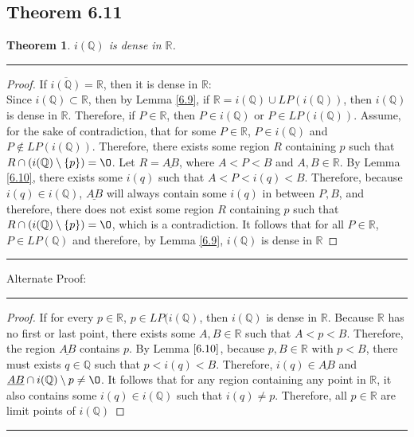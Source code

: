 \documentclass[openany, amssymb, psamsfonts]{amsart}
\newcommand{\bbQ}{\mathbb{Q}}
\newcommand{\bbR}{\mathbb{R}}
\renewcommand{\emptyset}{\O}
\newcommand{\sm}{\setminus}
\newtheorem{thm}{Theorem}[section]
\theoremstyle{definition}
\numberwithin{equation}{section}
\begin{document}
\subsection*{Theorem 6.11}
\begin{thm}
\label{6.11}
$i(\bbQ)$ is dense in $\bbR$.
\end{thm}
\vspace{4pt}     \hrule   \vspace{4pt} \begin{proof} If $\overline{i(\bbQ)} = \bbR$, then it is dense in $\bbR$:\\
Since $i(\bbQ) \subset \bbR$, then by Lemma \ref{6.9}, if $\bbR = i(\bbQ) \cup LP(i(\bbQ))$, then $i(\bbQ)$ is dense in $\bbR$. Therefore, if $P\in \bbR$, then $P\in i(\bbQ)$ or $P\in LP(i(\bbQ))$. Assume, for the sake of contradiction, that for some $P\in \bbR$, $P\in i(\bbQ)$ and $P\notin LP(i(\bbQ))$. Therefore, there exists some region $R$ containing $p$ such that $R\cap (i(\bbQ)\sm\{p\}) = \emptyset$. Let $R= \underline{AB}$, where $A<P<B$ and $A,B\in \bbR$. By Lemma \ref{6.10}, there exists some $i(q)$ such that $A<P<i(q)<B$. Therefore, because $i(q)\in i(\bbQ)$, $\underline{AB}$ will always contain some $i(q)$ in between $P,B$, and therefore, there does not exist some region $R$ containing $p$ such that $R\cap (i(\bbQ)\sm\{p\}) = \emptyset$, which is a contradiction. It follows that for all $P\in \bbR$, $P\in LP(\bbQ)$ and therefore, by Lemma \ref{6.9}, $i(\bbQ)$ is dense in $\bbR$
\end{proof}
\vspace{4pt}     \hrule   \vspace{4pt}
Alternate Proof:
\vspace{4pt}     \hrule   \vspace{4pt} \begin{proof} 
If for every $p\in \bbR$, $p\in LP(i(\bbQ)$, then $i(\bbQ)$ is dense in $\bbR$. Because $\bbR$ has no first or last point, there exists some $A,B \in \bbR$ such that $A<p<B$. Therefore, the region $\underline{AB}$ contains $p$. By Lemma $\ref{6.10}$, because $p,B \in \bbR$ with $p<B$, there must exists $q\in \bbQ$ such that $p<i(q)<B$. Therefore, $i(q) \in \underline{AB}$ and $\underline{AB} \cap i(\bbQ)\sm {p} \neq \emptyset$. It follows that for any region containing any point in $\bbR$, it also contains some $i(q)\in i(\bbQ)$ such that $i(q) \neq p$. Therefore, all $p\in \bbR$ are limit points of $i(\bbQ)$
\end{proof}
\vspace{4pt}     \hrule   \vspace{4pt}
\end{document}
